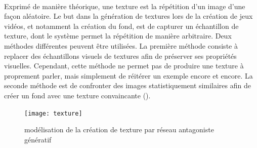 \documentclass[a4paper,11pt]{article} %
\begin{document}
\paragraph{
}
Exprimé de manière théorique, une texture est la répétition d'un image d'une façon aléatoire. Le but dans la génération de textures lors de la création de jeux vidéos, et notamment la création du fond, est de capturer un échantillon de texture, dont le système permet la répétition de manière arbitraire. Deux méthodes différentes peuvent être utilisées. La première méthode consiste à replacer des échantillons visuels de textures afin de préserver ses propriétés visuelles. Cependant, cette méthode ne permet pas de produire une texture à proprement parler, mais simplement de réitérer un exemple encore et encore. La seconde méthode est de confronter des images statistiquement similaires afin de créer un fond avec une texture convaincante (\citeauthor{jetchev_texture_2017}).

\begin{figure}[h] %
  \centering %
  \texttt{[image: texture]}
  \caption{modélisation de la création de texture par réseau antagoniste génératif} %
\end{figure}



\begin{thebibliography}{}
\printbibliography

\end{thebibliography}
\end{document}
